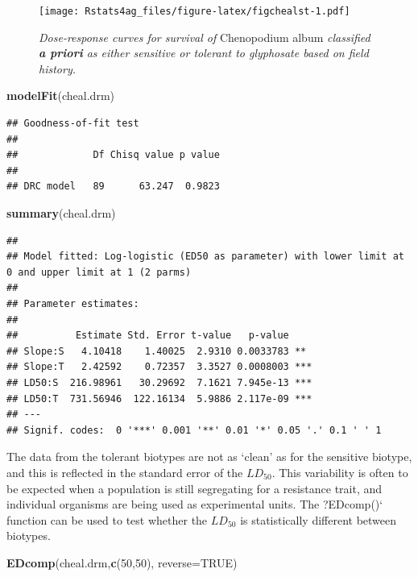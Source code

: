 \documentclass[letterpaper,]{book}
\newenvironment{Shaded}{\begin{snugshade}}{\end{snugshade}}
\newcommand{\DataTypeTok}[1]{\textcolor[rgb]{0.13,0.29,0.53}{#1}}
\newcommand{\DecValTok}[1]{\textcolor[rgb]{0.00,0.00,0.81}{#1}}
\newcommand{\KeywordTok}[1]{\textcolor[rgb]{0.13,0.29,0.53}{\textbf{#1}}}
\newcommand{\NormalTok}[1]{#1}
\newcommand{\OtherTok}[1]{\textcolor[rgb]{0.56,0.35,0.01}{#1}}
\begin{document}
\begin{figure}
\centering
\texttt{[image: Rstats4ag\_files/figure-latex/figchealst-1.pdf]}
\caption{\label{fig:figchealst}\emph{Dose-response curves for survival of} Chenopodium album \emph{classified \textbf{a priori} as either sensitive or tolerant to glyphosate based on field history.}}
\end{figure}

\begin{Shaded}
\begin{Highlighting}[]
\KeywordTok{modelFit}\NormalTok{(cheal.drm)}
\end{Highlighting}
\end{Shaded}

\begin{verbatim}
## Goodness-of-fit test
## 
##             Df Chisq value p value
##                                   
## DRC model   89      63.247  0.9823
\end{verbatim}

\begin{Shaded}
\begin{Highlighting}[]
\KeywordTok{summary}\NormalTok{(cheal.drm)}
\end{Highlighting}
\end{Shaded}

\begin{verbatim}
## 
## Model fitted: Log-logistic (ED50 as parameter) with lower limit at 0 and upper limit at 1 (2 parms)
## 
## Parameter estimates:
## 
##          Estimate Std. Error t-value   p-value    
## Slope:S   4.10418    1.40025  2.9310 0.0033783 ** 
## Slope:T   2.42592    0.72357  3.3527 0.0008003 ***
## LD50:S  216.98961   30.29692  7.1621 7.945e-13 ***
## LD50:T  731.56946  122.16134  5.9886 2.117e-09 ***
## ---
## Signif. codes:  0 '***' 0.001 '**' 0.01 '*' 0.05 '.' 0.1 ' ' 1
\end{verbatim}

The data from the tolerant biotypes are not as `clean' as for the sensitive biotype, and this is reflected in the standard error of the \(LD_{50}\). This variability is often to be expected when a population is still segregating for a resistance trait, and individual organisms are being used as experimental units. The ?EDcomp()` function can be used to test whether the \(LD_{50}\) is statistically different between biotypes.

\begin{Shaded}
\begin{Highlighting}[]
\KeywordTok{EDcomp}\NormalTok{(cheal.drm,}\KeywordTok{c}\NormalTok{(}\DecValTok{50}\NormalTok{,}\DecValTok{50}\NormalTok{), }\DataTypeTok{reverse=}\OtherTok{TRUE}\NormalTok{)}
\end{Highlighting}
\end{Shaded}
\end{document}
